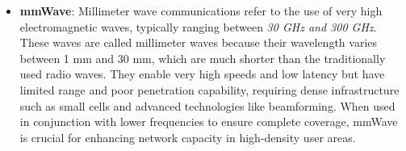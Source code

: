 \documentclass[english]{article}
\begin{document}
\begin{itemize}
	\item \textbf{\hypertarget{mmWave}{mmWave}}:
	      Millimeter wave communications refer to the use of very high electromagnetic waves,
	      typically ranging between \textit{30 GHz and 300 GHz}. These waves are called millimeter
	      waves because their wavelength varies between 1 mm and 30 mm, which are much shorter
	      than the traditionally used radio waves. They enable very high speeds and low latency
	      but have limited range and poor penetration capability, requiring dense infrastructure
	      such as small cells and advanced technologies like beamforming. When used in conjunction
	      with lower frequencies to ensure complete coverage, mmWave is crucial for enhancing network
	      capacity in high-density user areas.


\end{itemize}
\end{document}
